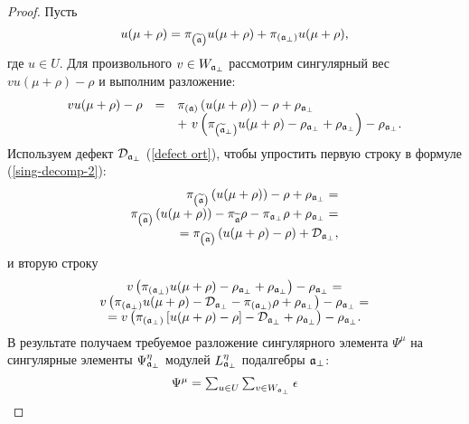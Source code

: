 \begin{proof}
Пусть
\[
u(\mu +\rho )=\pi _{\left( \widetilde{\mathfrak{a}}\right) }u(\mu +\rho )+\pi _{\left(
\frak{a}_{\perp }\right) }u(\mu +\rho ),
\]
где $u\in U$. Для произвольного  $v\in W_{\frak{a}_{\bot }}$ рассмотрим сингулярный вес  $vu(\mu +\rho )-\rho $ и выполним разложение:
\begin{equation}
\begin{array}{lcl}
vu(\mu +\rho )-\rho  & = & \pi _{\left( \frak{a}\right) }\left( u(\mu +\rho
)\right) -\rho +\rho _{\frak{a}_{\perp }}
\\
&  & +\ v\left( \pi _{\left( \aft_{\perp }\right) }u(\mu
+\rho )-\rho _{\frak{a}_{\perp }}+\rho _{\frak{a}_{\perp }}\right) -\rho _{%
\frak{a}_{\perp }} .
\end{array}
\label{sing-decomp-2}
\end{equation}
Используем дефект $\mathcal{D}_{\frak{a}_{\bot }}$ (\ref{defect ort}), чтобы упростить первую строку в формуле (\ref{sing-decomp-2}):
\[
\begin{array}{r}
\pi _{\left( \aft\right) }\left( u(\mu +\rho )\right) -\rho +\rho _{%
\frak{a}_{\perp }}= \\
\pi _{\left( \aft\right) }\left( u(\mu +\rho )\right) -\pi _{\aft%
}\rho -\pi _{\af_{\bot }}\rho +\rho _{\frak{a}_{\bot }}= \\
=\pi _{\left( \aft\right) }\left( u(\mu +\rho )-\rho \right) +\mathcal{D}%
_{\frak{a}_{\bot }},
\end{array}
\]
и вторую строку
\[
\begin{array}{c}
v\left( \pi _{\left( \frak{a}_{\perp }\right) }u(\mu +\rho
)-\rho _{\frak{a}_{\perp }}+\rho _{\frak{a}_{\perp }}\right) -\rho _{\frak{a}%
_{\perp }}= \\
v\left( \pi _{\left( \frak{a}_{\bot }\right) }u(\mu +\rho )-%
\mathcal{D}_{\frak{a}_{\bot }}-\pi _{\left( \frak{a}_{\bot }\right) }\rho
+\rho _{\frak{a}_{\bot }}\right)
-\rho _{\frak{a}_{\bot }}= \\
=v\left( \pi _{\left( \frak{a}_{\bot }\right) }\left[ u(\mu
+\rho )-\rho \right] -\mathcal{D}_{\frak{a}_{\bot }}+\rho _{\frak{a}_{\bot
}}\right) -\rho _{\frak{a}_{\bot }}.
\end{array}
\]
В результате получаем требуемое разложение сингулярного элемента $\Psi ^{\mu }$ на сингулярные элементы $\Psi_{\frak{a}_{\perp}}^{\eta}$ модулей $L_{\frak{a}_{\perp }}^{\eta }$ подалгебры $\frak{a}_{\perp }$: 
\begin{equation}
\begin{array}{l}
\Psi ^{\mu }=\sum_{u\in U}\sum_{v\in W_{\frak{a}_{\perp }}}\epsilon

\end{array}
\end{equation}
\end{proof}
